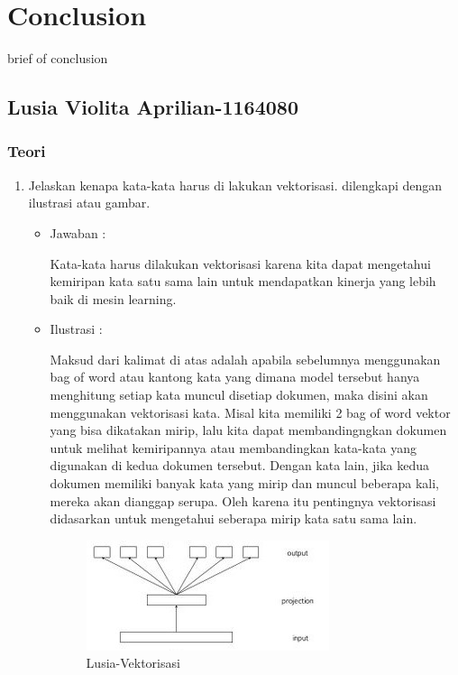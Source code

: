\chapter{Conclusion}
brief of conclusion

\section{Lusia Violita Aprilian-1164080}

\subsection{Teori}

\begin{enumerate}

\item Jelaskan kenapa kata-kata harus di lakukan vektorisasi. dilengkapi dengan ilustrasi atau gambar.
	\begin{itemize}
	\item Jawaban :
		\par Kata-kata harus dilakukan vektorisasi karena kita dapat mengetahui kemiripan kata satu sama lain untuk mendapatkan kinerja yang lebih baik di mesin learning.
	\item Ilustrasi :
		\par Maksud dari kalimat di atas adalah  apabila sebelumnya menggunakan bag of word atau kantong kata yang dimana model tersebut hanya menghitung setiap kata muncul disetiap dokumen, maka disini akan menggunakan vektorisasi kata. Misal kita memiliki 2 bag of word vektor yang bisa dikatakan mirip, lalu kita dapat membandingngkan dokumen untuk melihat kemiripannya atau membandingkan kata-kata yang digunakan di kedua dokumen tersebut. Dengan kata lain, jika kedua dokumen memiliki banyak kata yang mirip dan muncul beberapa kali, mereka akan dianggap serupa.  Oleh karena itu pentingnya vektorisasi didasarkan untuk mengetahui seberapa mirip kata satu sama lain. 
		\begin{figure}[ht]
		\centering
		\includegraphics[scale=0.5]{figures/p1.jpg}
		\caption{Lusia-Vektorisasi}
		\label{contoh}
		\end{figure}
	\end{itemize}


\end{enumerate}
